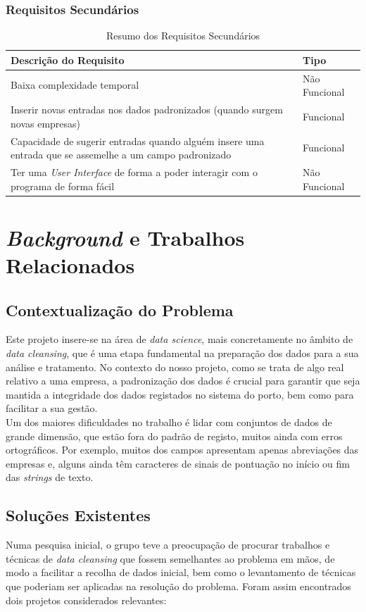 \documentclass[a4paper,12pt]{article}
\begin{document}
\subsubsection{Requisitos Secundários}
\begin{table}[h!]
    \centering
    \begin{tabularx}{\textwidth}{|X|l|}
        \hline
        \textbf{Descrição do Requisito} & \textbf{Tipo} \\ \hline
        Baixa complexidade temporal & Não Funcional \\ \hline
        Inserir novas entradas nos dados padronizados (quando surgem novas empresas) & Funcional \\ \hline
        Capacidade de sugerir entradas quando alguém insere uma entrada que se assemelhe a um campo padronizado & Funcional \\ \hline
        Ter uma \textit{User Interface} de forma a poder interagir com o programa de forma fácil & Não Funcional \\ \hline
    \end{tabularx}
    \caption{Resumo dos Requisitos Secundários}
    \label{tab:requirements-secondary}
\end{table}

\newpage
\section{\textit{Background} e Trabalhos Relacionados}
\subsection{Contextualização do Problema}
Este projeto insere-se na área de \textit{data science}, mais concretamente no âmbito de \textit{data cleansing}, que é uma etapa fundamental na preparação dos dados para a sua análise e tratamento. No contexto do nosso projeto, como se trata de algo real relativo a uma empresa, a padronização dos dados é crucial para garantir que seja mantida a integridade dos dados registados no sistema do porto, bem como para facilitar a sua gestão.\\
Um dos maiores dificuldades no trabalho é lidar com conjuntos de dados de grande dimensão, que estão fora do padrão de registo, muitos ainda com erros ortográficos.
Por exemplo, muitos dos campos apresentam apenas abreviações das empresas e, alguns ainda têm caracteres de sinais de pontuação no início ou fim das \textit{strings} de texto.

\subsection{Soluções Existentes}
Numa pesquisa inicial, o grupo teve a preocupação de procurar trabalhos e técnicas de \textit{data cleansing} que fossem semelhantes ao problema em mãos, de modo a facilitar a recolha de dados inicial, bem como o levantamento de técnicas que poderiam ser aplicadas na resolução do problema. Foram assim encontrados dois projetos considerados relevantes:
\end{document}
